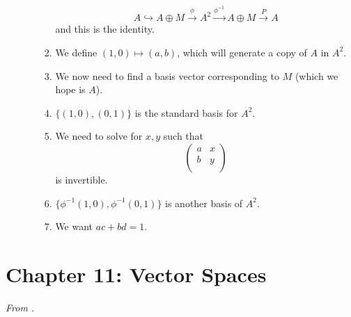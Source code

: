 \documentclass[../notes.tex]{subfiles}
\begin{document}
\begin{itemize}
\begin{itemize}
\begin{enumerate}
            \begin{equation*}
                A\hookrightarrow A\oplus M\xrightarrow{\phi}A^2\xrightarrow{\phi^{-1}}A\oplus M\xrightarrow{P}A
            \end{equation*}
            and this is the identity.
            \item We define $(1,0)\mapsto(a,b)$, which will generate a copy of $A$ in $A^2$.
            \item We now need to find a basis vector corresponding to $M$ (which we hope is $A$).
            \item $\{(1,0),(0,1)\}$ is the standard basis for $A^2$.
            \item We need to solve for $x,y$ such that
            \begin{equation*}
                \begin{pmatrix}
                    a & x\\
                    b & y\\
                \end{pmatrix}
            \end{equation*}
            is invertible.
            \item $\{\phi^{-1}(1,0),\phi^{-1}(0,1)\}$ is another basis of $A^2$.
            \item We want $ac+bd=1$.
        \end{enumerate}
    \end{itemize}
\end{itemize}



\section{Chapter 11: Vector Spaces}
\emph{From \textcite{bib:DummitFoote}.}
\setcounter{bookch}{11}
\end{document}
